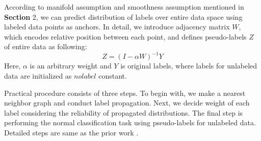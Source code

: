 \documentclass[10pt,twocolumn,letterpaper]{article}
\begin{document}
	According to manifold assumption and smoothness assumption mentioned in \textbf{Section} 2, we can predict distribution of labels over entire data space using labeled data points as anchors. In detail, we introduce adjacency matrix $W$, which encodes relative position between each point, and defines pseudo-labels $Z$ of entire data as following:
	\begin{equation}
		Z=(I-\alpha W)^{-1}Y
	\end{equation}
	Here, $\alpha$ is an arbitrary weight and $Y$ is original labels, where labels for unlabeled data are initialized as $no label$ constant.
	
	Practical procedure consists of three steps. To begin with, we make a nearest neighbor graph and conduct label propagation. Next, we decide weight of each label considering the reliability of propagated distributions. The final step is performing the normal classification task using pseudo-labels for unlabeled data. Detailed steps are same as the prior work \cite{Iscen2019}.\\ 
	
	
	
	
\end{document}
